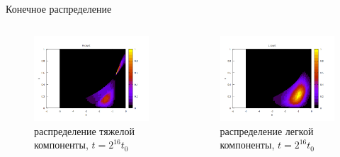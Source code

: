 Конечное распределение
\begin{columns}[c]
	\begin{column}{0.5\textwidth} %
		\begin{figure}
			\includegraphics[width=\linewidth
			]{images/dhf.png}
			\caption{распределение тяжелой компоненты, $t = 2^{16}t_0$}
		\end{figure}
	\end{column}
	\begin{column}{0.5\textwidth} 
		\begin{figure}
			\includegraphics[width=\linewidth]
			{images/dlf.png}
			\caption{распределение легкой компоненты, $t = 2^{16}t_0$}
		\end{figure}
	\end{column}
\end{columns}